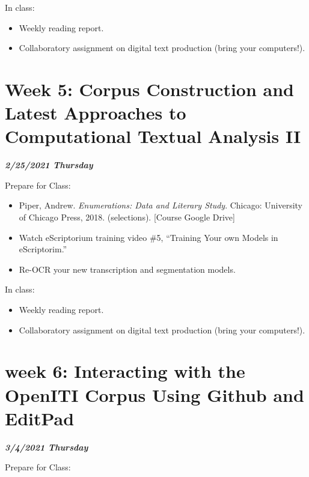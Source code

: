 \documentclass[
]{book}
\providecommand{\tightlist}{%
  \setlength{\itemsep}{0pt}\setlength{\parskip}{0pt}}
\begin{document}
In class:

\begin{itemize}
\tightlist
\item
  Weekly reading report.
\item
  Collaboratory assignment on digital text production (bring your computers!).
\end{itemize}

\hypertarget{week-5-corpus-construction-and-latest-approaches-to-computational-textual-analysis-ii-1}{%
\chapter{Week 5: Corpus Construction and Latest Approaches to Computational Textual Analysis II}\label{week-5-corpus-construction-and-latest-approaches-to-computational-textual-analysis-ii-1}}

\textbf{\emph{2/25/2021 Thursday}}

Prepare for Class:

\begin{itemize}
\tightlist
\item
  Piper, Andrew. \emph{Enumerations: Data and Literary Study}. Chicago: University of Chicago Press, 2018. (selections). {[}Course Google Drive{]}
\item
  Watch eScriptorium training video \#5, ``Training Your own Models in eScriptorim.''
\item
  Re-OCR your new transcription and segmentation models.
\end{itemize}

In class:

\begin{itemize}
\tightlist
\item
  Weekly reading report.
\item
  Collaboratory assignment on digital text production (bring your computers!).
\end{itemize}

\hypertarget{week-6-interacting-with-the-openiti-corpus-using-github-and-editpad-1}{%
\chapter{week 6: Interacting with the OpenITI Corpus Using Github and EditPad}\label{week-6-interacting-with-the-openiti-corpus-using-github-and-editpad-1}}

\textbf{\emph{3/4/2021 Thursday}}

Prepare for Class:
\end{document}
